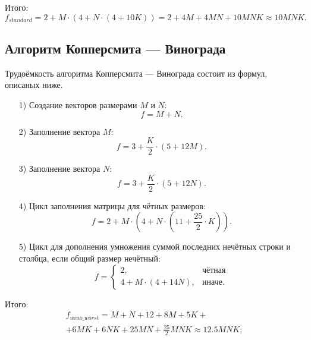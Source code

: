 \documentclass[a4paper,14pt, unknownkeysallowed]{extreport}
\begin{document}
Итого:
\begin{equation}
\label{for:standard}
	f_{standard} = 2 + M \cdot (4 + N \cdot (4 + 10K)) = 2 + 4M + 4MN + 10MNK \approx 10MNK.
\end{equation}
	
\subsection{Алгоритм Копперсмита — Винограда}
Трудоёмкость алгоритма Копперсмита — Винограда состоит из формул, описаных ниже.

\begin{enumerate}
	\item[1)] Создание векторов размерами $M$ и $N$:
    \begin{equation}
        f = M + N.
    \end{equation}
		
	\item[2)] Заполнение вектора $M$:
    \begin{equation}
        f = 3 + \frac{K}{2} \cdot (5 + 12M).
    \end{equation}
		
	\item[3)] Заполнение вектора $N$:
    \begin{equation}
        f = 3 + \frac{K}{2} \cdot (5 + 12N).
    \end{equation}

    \clearpage
 
	\item[4)] Цикл заполнения матрицы для чётных размеров:
    \begin{equation}
        f = 2 + M \cdot (4 + N \cdot (11 + \frac{25}{2} \cdot K)).
    \end{equation}

	\item[5)] Цикл для дополнения умножения суммой последних нечётных строки и столбца, если общий размер нечётный:
    \begin{equation}
		f = \begin{cases}
		2, & \text{чётная}\\
		4 + M \cdot (4 + 14N), & \text{иначе.}
		\end{cases}
   \end{equation}
\end{enumerate}

Итого:
\begin{equation}
    \begin{gathered}
	f_{wino\_worst} = M + N + 12 + 8M + 5K + \\ + 6MK + 6NK + 25MN + \frac{25}{2}MNK \approx  12.5MNK;
    \end{gathered}
\end{equation}
\end{document}
